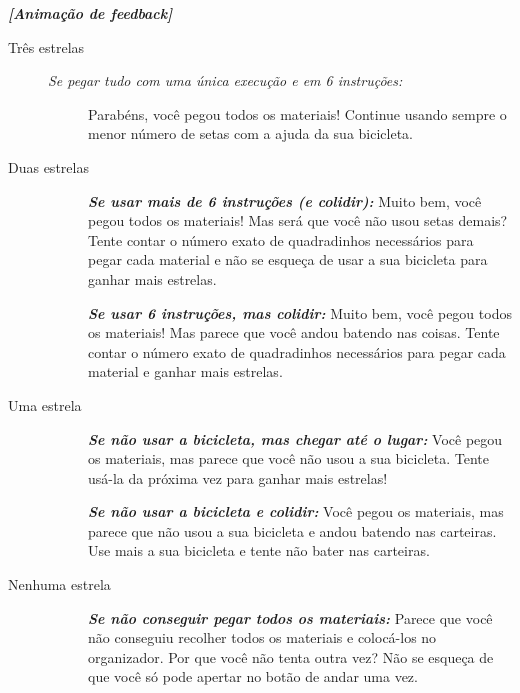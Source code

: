 \begin{description}
\begin{description}
        \item \textbf{\textit{[Animação de feedback]}}
        \begin{description}
        	\item[Três estrelas]
        	\begin{description}
        	    \item[]
        	    \item[\textit{Se pegar tudo com uma única execução e em 6 instruções:}] Parabéns, você pegou todos os materiais! Continue usando sempre o menor número de setas com a ajuda da sua bicicleta.
        	\end{description}
			\item[Duas estrelas]
			\begin{description}
			    \item[]
				\item[]\textit{\textbf{Se usar mais de 6 instruções (e colidir):}} Muito bem, você pegou todos os materiais! Mas será que você não usou setas demais? Tente contar o número exato de quadradinhos necessários para pegar cada material e não se esqueça de usar a sua bicicleta para ganhar mais estrelas.
				\item[]\textit{\textbf{Se usar 6 instruções, mas colidir:}} Muito bem, você pegou todos os materiais! Mas parece que você andou batendo nas coisas. Tente contar o número exato de quadradinhos necessários para pegar cada material e ganhar mais estrelas.
			\end{description}
			\item[Uma estrela]
            \begin{description}
                \item[]
            	\item[] \textbf{\textit{Se não usar a bicicleta, mas chegar até o lugar:}} Você pegou os materiais, mas parece que você não usou a sua bicicleta. Tente usá-la da próxima vez para ganhar mais estrelas!
                \item[] \textit{\textbf{Se não usar a bicicleta e colidir:}} Você pegou os materiais, mas parece que não usou a sua bicicleta e andou batendo nas carteiras. Use mais a sua bicicleta e tente não bater nas carteiras.
            \end{description}
            \item[Nenhuma estrela]
            \begin{description}
                \item[]
                \item[] \textbf{\textit{Se não conseguir pegar todos os materiais:}} Parece que você não conseguiu recolher todos os materiais e colocá-los no organizador. Por que você não tenta outra vez? Não se esqueça de que você só pode apertar no botão de andar uma vez.

\end{description}
\end{description}
\end{description}
\end{description}
